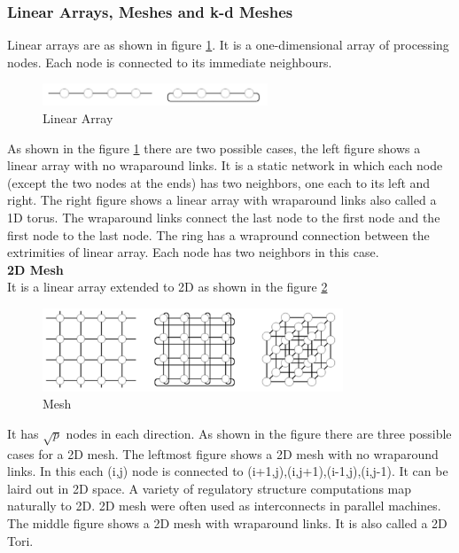 \documentclass[12pt]{article}
\begin{document}
\subsubsection{Linear Arrays, Meshes and k-d Meshes}
Linear arrays are as shown in figure \ref{fig:linear}. It is a one-dimensional array of processing nodes. Each node is connected to its immediate neighbours.
\begin{figure}[H]
    \centering
    \includegraphics[width=0.6\textwidth]{images/lineararrays.png}
    \caption{Linear Array}
    \label{fig:linear}
\end{figure}
As shown in the figure \ref{fig:linear} there are two possible cases, the left figure shows a linear array with no wraparound links. It is a 
static network in which each node (except the two nodes at the ends) has two neighbors, one each to its left and right.
The right figure shows a linear array with wraparound links also called a 1D torus. The wraparound links connect the last node to the first node and the first node to the last node.
The ring has a wrapround connection between the extrimities of linear array. Each node has two neighbors in this case.\\
\textbf{2D Mesh}\\
It is a linear array extended to 2D as shown in the figure \ref{fig:2dmesh}
\begin{figure}[H]
    \centering
    \includegraphics[width=0.8\textwidth]{images/mesh.png}
    \caption{Mesh}
    \label{fig:2dmesh}
\end{figure}
It has $\sqrt{p}$ nodes in each direction. As shown in the figure there are three possible cases for a 2D mesh.
The leftmost figure shows a 2D mesh with no wraparound links. In this each (i,j) node is connected to (i+1,j),(i,j+1),(i-1,j),(i,j-1).
It can be laird out in 2D space. A variety of regulatory structure computations map naturally to 2D. 2D mesh were often used as interconnects in parallel machines.\\
The middle figure shows a 2D mesh with wraparound links. It is also called a 2D Tori.\\
\end{document}
